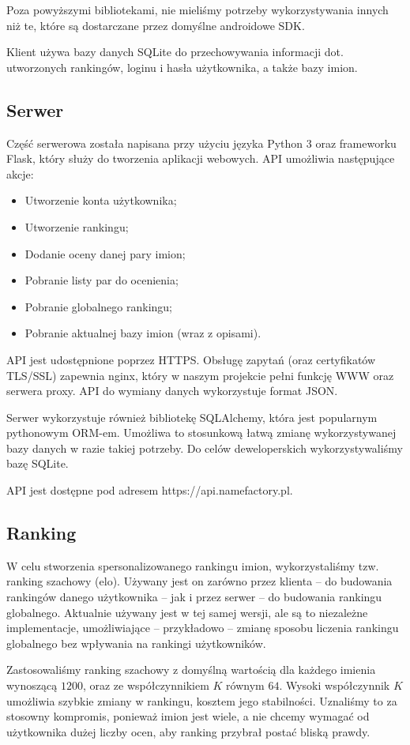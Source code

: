 \documentclass[12pt,a4paper]{article}
\begin{document}
Poza powyższymi bibliotekami, nie mieliśmy potrzeby wykorzystywania innych niż te, które są dostarczane przez domyślne androidowe SDK.

Klient używa bazy danych SQLite do przechowywania informacji dot. utworzonych rankingów, loginu i hasła użytkownika, a także bazy imion.

\subsection{Serwer}
Część serwerowa została napisana przy użyciu języka Python 3 oraz frameworku Flask, który służy do tworzenia aplikacji webowych.
API umożliwia następujące akcje:

\begin{itemize}
    \item Utworzenie konta użytkownika;
    \item Utworzenie rankingu;
    \item Dodanie oceny danej pary imion;
    \item Pobranie listy par do ocenienia;
    \item Pobranie globalnego rankingu;
    \item Pobranie aktualnej bazy imion (wraz z opisami).
\end{itemize}

API jest udostępnione poprzez HTTPS.
Obsługę zapytań (oraz certyfikatów TLS/SSL) zapewnia nginx, który w naszym projekcie pełni funkcję WWW oraz serwera proxy.
API do wymiany danych wykorzystuje format JSON.

Serwer wykorzystuje również bibliotekę SQLAlchemy, która jest popularnym pythonowym ORM-em.
Umożliwa to stosunkową łatwą zmianę wykorzystywanej bazy danych w razie takiej potrzeby.
Do celów deweloperskich wykorzystywaliśmy bazę SQLite.

API jest dostępne pod adresem https://api.namefactory.pl.

\subsection{Ranking}
W celu stworzenia spersonalizowanego rankingu imion, wykorzystaliśmy tzw. ranking szachowy (elo).
Używany jest on zarówno przez klienta -- do budowania rankingów danego użytkownika -- jak i przez serwer -- do budowania rankingu globalnego.
Aktualnie używany jest w tej samej wersji, ale są to niezależne implementacje, umożliwiające -- przykładowo -- zmianę sposobu liczenia rankingu globalnego bez wpływania na rankingi użytkowników.

Zastosowaliśmy ranking szachowy z domyślną wartością dla każdego imienia wynoszącą \(1200\), oraz ze współczynnikiem \(K\) równym \(64\).
Wysoki współczynnik \(K\) umożliwia szybkie zmiany w rankingu, kosztem jego stabilności.
Uznaliśmy to za stosowny kompromis, ponieważ imion jest wiele, a nie chcemy wymagać od użytkownika dużej liczby ocen, aby ranking przybrał postać bliską prawdy.
\end{document}
